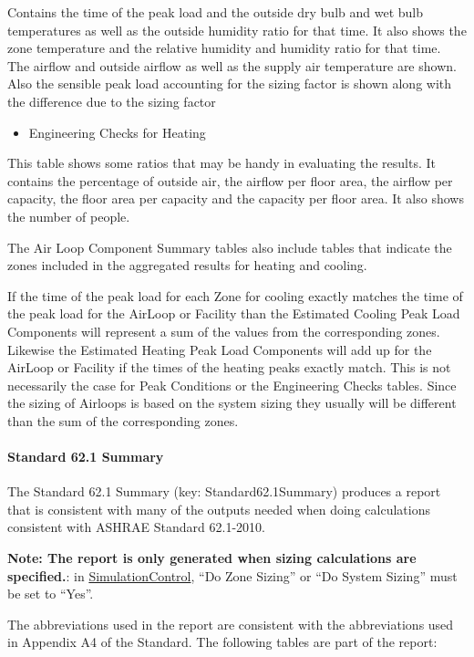 Contains the time of the peak load and the outside dry bulb and wet bulb temperatures as well as the outside humidity ratio for that time. It also shows the zone temperature and the relative humidity and humidity ratio for that time. The airflow and outside airflow as well as the supply air temperature are shown. Also the sensible peak load accounting for the sizing factor is shown along with the difference due to the sizing factor

\begin{itemize}
\tightlist
\item
  Engineering Checks for Heating
\end{itemize}

This table shows some ratios that may be handy in evaluating the results. It contains the percentage of outside air, the airflow per floor area, the airflow per capacity, the floor area per capacity and the capacity per floor area. It also shows the number of people.

The Air Loop Component Summary tables also include tables that indicate the zones included in the aggregated results for heating and cooling.

If the time of the peak load for each Zone for cooling exactly matches the time of the peak load for the AirLoop or Facility than the Estimated Cooling Peak Load Components will represent a sum of the values from the corresponding zones. Likewise the Estimated Heating Peak Load Components will add up for the AirLoop or Facility if the times of the heating peaks exactly match. This is not necessarily the case for Peak Conditions or the Engineering Checks tables. Since the sizing of Airloops is based on the system sizing they usually will be different than the sum of the corresponding zones.

\paragraph{Standard 62.1 Summary}\label{standard-62.1-summary}

The Standard 62.1 Summary (key: Standard62.1Summary) produces a report that is consistent with many of the outputs needed when doing calculations consistent with ASHRAE Standard 62.1-2010.

\textbf{Note: The report is only generated when sizing calculations are specified.}: in \hyperref[simulationcontrol]{SimulationControl}, ``Do Zone Sizing'' or ``Do System Sizing'' must be set to ``Yes''.

The abbreviations used in the report are consistent with the abbreviations used in Appendix A4 of the Standard. The following tables are part of the report:

